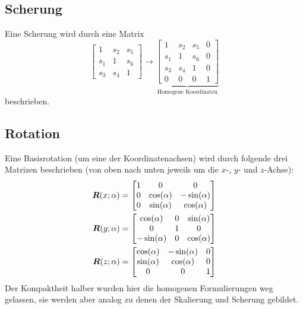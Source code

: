 		\subsection{Scherung}
			Eine Scherung wird durch eine Matrix
			\begin{equation*}
				\begin{bmatrix}
					1   & s_2 & s_5 \\
					s_1 & 1   & s_6 \\
					s_3 & s_4 & 1
				\end{bmatrix}
				\to
				\underbrace{
					\begin{bmatrix}
						1   & s_2 & s_5 & 0 \\
						s_1 & 1   & s_6 & 0 \\
						s_3 & s_4 & 1   & 0 \\
						0   & 0   & 0   & 1
					\end{bmatrix}
				}_\text{Homogene Koordinaten}
			\end{equation*}
			beschrieben.

		\subsection{Rotation}
			Eine Basisrotation (um eine der Koordinatenachsen) wird durch folgende drei Matrizen beschrieben (von oben nach unten jeweils um die \(x\)-, \(y\)- und \(z\)-Achse):
			\begin{align*}
				\bm{R}(x; \alpha) &=
					\begin{bmatrix}
						1 & 0            & 0             \\
						0 & \cos(\alpha) & -\sin(\alpha) \\
						0 & \sin(\alpha) & \cos(\alpha)
					\end{bmatrix} \\
				\bm{R}(y; \alpha) &=
					\begin{bmatrix}
						\cos(\alpha)  & 0 & \sin(\alpha) \\
						0             & 1 & 0            \\
						-\sin(\alpha) & 0 & \cos(\alpha)
					\end{bmatrix} \\
				\bm{R}(z; \alpha) &=
					\begin{bmatrix}
						\cos(\alpha) & -\sin(\alpha) & 0 \\
						\sin(\alpha) & \cos(\alpha)  & 0 \\
						0            & 0             & 1
					\end{bmatrix}
			\end{align*}
			Der Kompaktheit halber wurden hier die homogenen Formulierungen weg gelassen, sie werden aber analog zu denen der Skalierung und Scherung gebildet.

